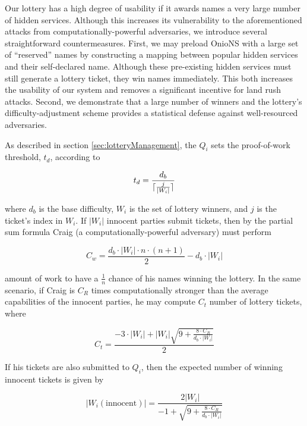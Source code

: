 \documentclass[USenglish,oneside,twocolumn]{article}
\DeclarePairedDelimiter{\ceil}{\lceil}{\rceil}
\newcommand*\nWinners{\left\vert{W_{i}}\right\vert}
\begin{document}
Our lottery has a high degree of usability if it awards names a very large number of hidden services. Although this increases its vulnerability to the aforementioned attacks from computationally-powerful adversaries, we introduce several straightforward countermeasures. First, we may preload OnioNS with a large set of ``reserved'' names by constructing a mapping between popular hidden services and their self-declared name. Although these pre-existing hidden services must still generate a lottery ticket, they win names immediately. This both increases the usability of our system and removes a significant incentive for land rush attacks. Second, we demonstrate that a large number of winners and the lottery's difficulty-adjustment scheme provides a statistical defense against well-resourced adversaries.

As described in section \ref{sec:lotteryManagement}, the $ Q_{i} $ sets the proof-of-work threshold, $ t_{d} $, according to 

\begin{equation}
	t_{d} = \frac{d_{b}}{\ceil{\frac{j}{\nWinners}}}
\end{equation}

\noindent where $ d_{b} $ is the base difficulty, $ W_{i} $ is the set of lottery winners, and $ j $ is the ticket's index in $ W_{i} $. If $ \nWinners $ innocent parties submit tickets, then by the partial sum formula Craig (a computationally-powerful adversary) must perform 

\begin{equation}
	C_{w} = \frac{d_{b} \cdot \nWinners \cdot n \cdot  (n+1)}{2} - d_{b} \cdot \nWinners
	\label{eq:CraigWork}
\end{equation}

\noindent amount of work to have a $ \frac{1}{n} $ chance of his names winning the lottery. In the same scenario, if Craig is $ C_{R} $ times computationally stronger than the average capabilities of the innocent parties, he may compute $ C_{t} $ number of lottery tickets, where

\begin{equation}
	C_{t} = \frac{-3 \cdot \nWinners + \nWinners \sqrt{9 + \frac{8 \cdot C_{R}}{d_{b} \cdot \nWinners}}}{2}
	\label{eq:nCraigTickets}
\end{equation}

If his tickets are also submitted to $ Q_{i} $, then the expected number of winning innocent tickets is given by

\begin{equation}
	\left\vert{W_{i}(\mathrm{innocent})}\right\vert = \frac{2 \nWinners}{-1 + \sqrt{9 + \frac{8 \cdot C_{R}}{d_{b} \cdot \nWinners}}}
	\label{eq:expInnocentWinners}
\end{equation}
\end{document}
